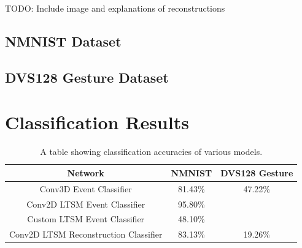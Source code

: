 \color{red} TODO: Include image and explanations of reconstructions \color{black}

\subsection{NMNIST Dataset}

\subsection{DVS128 Gesture Dataset}

\section{Classification Results}

\begin{table}[htb]
    \centering
    \begin{tabular}{|| c | c | c ||}
        \hline
        Network     & NMNIST & DVS128 Gesture \\
        \hline \hline
        Conv3D Event Classifier          & 81.43\%   &   \color{red} 47.22\% \color{black}    \\
        \hline
        Conv2D LTSM Event Classifier         & 95.80\%   &        \\
        \hline
        Custom LTSM Event Classifier         & \color{red} 48.10\% \color{black}   &        \\
        \hline
        Conv2D LTSM Reconstruction Classifier           & \color{red} 83.13\% \color{black}    &    \color{red} 19.26\% \color{black}   \\
        \hline
    \end{tabular}
    \caption{A table showing classification accuracies of various models.}
    \label{tab:network_performances}
\end{table}